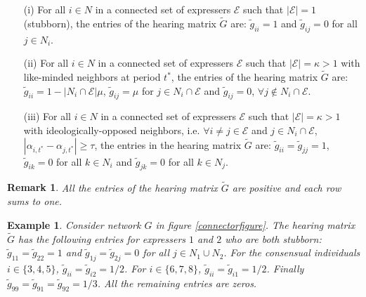 \documentclass{article}
\newtheorem{example}{Example}
\newtheorem{remark}[theorem]{Remark}
\begin{document}
\begin{itemize} 
\item[(i)] For all $i \in N$ in a connected set of expressers $\mathcal{E}$ such that $|\mathcal{E}|=1$ (stubborn), the entries of the hearing matrix $\tilde{G}$ are: $\tilde{g}_{ii}=1$ and $\tilde{g}_{ij}=0$ for all $j \in N_i$. 

\item[(ii)] For all $i \in N$ in a connected set of expressers $\mathcal{E}$ such that $|\mathcal{E}| = \kappa > 1$ with like-minded neighbors at period $t^{*}$, the entries of the hearing matrix $\tilde{G}$ are: $\tilde{g}_{ii} = 1 - | N_i \cap \mathcal{E} | \mu$, $\tilde{g}_{ij} = \mu$ for $j \in N_i \cap \mathcal{E}$ and $\tilde{g}_{ij} =0$, $\forall j \not \in N_i \cap \mathcal{E} $. 
\item[(iii)] For all $i \in N$ in a connected set of expressers  $\mathcal{E}$ such that $|\mathcal{E}| = \kappa > 1$ with ideologically-opposed neighbors, i.e. $\forall i \neq j \in \mathcal{E}$ and $j \in N_i \cap \mathcal{E} $, $|\alpha_{i,t^{*} } - \alpha_{j,t^{*}} | \geq \tau $, the entries in the hearing matrix $\tilde{G}$ are: $\tilde{g}_{ii} = \tilde{g}_{jj} = 1$, $\tilde{g}_{ik} = 0$ for all $k \in N_i$ and  $\tilde{g}_{jk} = 0$ for all $k \in N_j$. 
  \end{itemize}

\begin{remark} All the entries of the hearing matrix $\tilde{G}$ are positive and each row sums to one. \end{remark}  
\begin{example} Consider network $G$ in figure \ref{connectorfigure}. The hearing matrix $\tilde{G}$ has the following entries for expressers $1$ and $2$ who are both stubborn: $\tilde{g}_{11} = \tilde{g}_{22} =1$ and $\tilde{g}_{1j} = \tilde{g}_{2j} =0$ for all $j \in N_1 \cup N_2$. For the consensual individuals $ i \in \{ 3, 4 , 5 \}$, $\tilde{g}_{ii}= \tilde{g}_{i2} = 1/2$. For $ i \in \{ 6, 7 , 8 \}$, $\tilde{g}_{ii}= \tilde{g}_{i1} = 1/2$. Finally $\tilde{g}_{99}= \tilde{g}_{91} = \tilde{g}_{92} =1/3$. All the remaining entries are zeros. 
\end{example}
\end{document}
